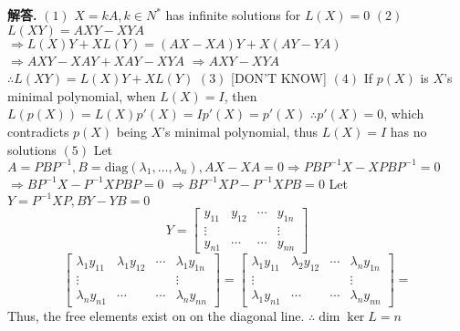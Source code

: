 \documentclass[10pt, a4paper, oneside]{article}
\newenvironment{solution}{\par\noindent\textbf{解答. }}{\par}
\begin{document}
\begin{CJK}{UTF8}{gbsn}
\begin{solution} \newline
  $(1)$ $X = kA, k \in N^*$ has infinite solutions for $L(X) = 0$ \newline
  $(2)$ $L(XY) = AXY - XYA$ \newline 
  $\Rightarrow L(X)Y + XL(Y) = (AX -XA)Y + X(AY-YA)$ \newline
  $\Rightarrow AXY - XAY + XAY - XYA$  \newline
  $\Rightarrow AXY - XYA$
  $\therefore L(XY) = L(X)Y + XL(Y)$ \newline 
  $(3)$ [DON'T KNOW]\newline
  $(4)$ If $p(X)$ is $X$'s minimal polynomial, when $L(X) = I$, then $L(p(X)) = L(X)p'(X) = Ip'(X)=p'(X)$ \newline
  $\therefore p'(X)=0$, which contradicts $p(X)$ being $X$'s minimal polynomial, thus $L(X) = I$ has no solutions \newline
  $(5)$ Let $A = PBP^{-1}, B = \text{diag}(\lambda_1,\dots,\lambda_n), AX -XA = 0 \Rightarrow PBP^{-1}X - XPBP^{-1} = 0$ \newline
  $\Rightarrow BP^{-1}X - P^{-1}XPBP = 0$ \newline
  $\Rightarrow BP^{-1}XP - P^{-1}XPB = 0$ \newline  
  Let $Y = P^{-1}XP, BY-YB = 0$
  $$ Y = \begin{bmatrix}
    y_{11} & y_{12} & \cdots & y_{1n} \\
    \vdots &  & & \vdots \\
    y_{n1} & \cdots & \cdots & y_{nn}
  \end{bmatrix}
  $$
  $$ \begin{bmatrix}
    \lambda_1 y_{11} & \lambda_1 y_{12} & \cdots & \lambda_1 y_{1n} \\
    \vdots &  & & \vdots \\
    \lambda_n y_{n1} & \cdots & \cdots &   \lambda_n y_{nn}
  \end{bmatrix} = \begin{bmatrix}
    \lambda_1 y_{11} & \lambda_2 y_{12} & \cdots & \lambda_n y_{1n} \\
    \vdots &  & & \vdots \\
    \lambda_1 y_{n1} & \cdots & \cdots &   \lambda_n y_{nn}
  \end{bmatrix} = $$ Thus, the free elements exist on on the diagonal line. \newline
  $\therefore \dim{\ker{L}} = n$
  

\end{solution}
\end{CJK}
\end{document}
